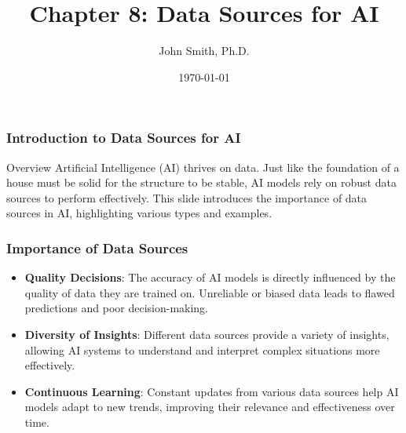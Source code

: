 \documentclass[aspectratio=169]{beamer}
\title[Data Sources for AI]{Chapter 8: Data Sources for AI}
\author[J. Smith]{John Smith, Ph.D.}
\institute[University Name]{
  Department of Computer Science\\
  University Name\\
  \vspace{0.3cm}
  Email: email@university.edu\\
  Website: www.university.edu
}
\date{\today}
\begin{document}
\frame{\titlepage}

\begin{frame}[fragile]
    \frametitle{Introduction to Data Sources for AI}
    \begin{block}{Overview}
        Artificial Intelligence (AI) thrives on data. Just like the foundation of a house must be solid for the structure to be stable, AI models rely on robust data sources to perform effectively. This slide introduces the importance of data sources in AI, highlighting various types and examples.
    \end{block}
\end{frame}

\begin{frame}[fragile]
    \frametitle{Importance of Data Sources}
    \begin{itemize}
        \item \textbf{Quality Decisions}: The accuracy of AI models is directly influenced by the quality of data they are trained on. Unreliable or biased data leads to flawed predictions and poor decision-making.
        \item \textbf{Diversity of Insights}: Different data sources provide a variety of insights, allowing AI systems to understand and interpret complex situations more effectively.
        \item \textbf{Continuous Learning}: Constant updates from various data sources help AI models adapt to new trends, improving their relevance and effectiveness over time.
    \end{itemize}
\end{frame}
\end{document}

